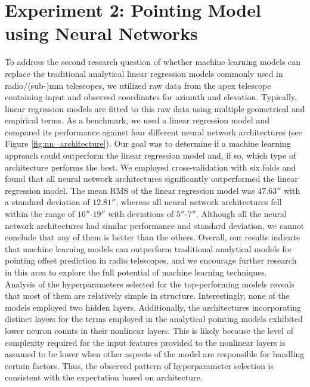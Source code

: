 \section{Experiment 2: Pointing Model using Neural Networks}
To address the second research question of whether machine learning models can replace the traditional analytical linear regression models commonly used in radio/(sub-)mm telescopes,
we utilized raw data from the apex telescope containing input and observed coordinates for azimuth and elevation.
Typically, linear regression models are fitted to this raw data using multiple geometrical and empirical terms.
As a benchmark, we used a linear regression model and compared its performance against four different neural network architectures (see Figure \ref{fig:nn_architecture}).
Our goal was to determine if a machine learning approach could outperform the linear regression model and, if so, which type of architecture performs the best.
We employed cross-validation with six folds and found that all neural network architectures significantly outperformed the linear regression model.
The mean RMS of the linear regression model was $47.63''$ with a standard deviation of $12.81''$, whereas all neural network architectures fell within the range of $16''$-$19''$ with deviations of $5''$-$7''$.
Although all the neural network architectures had similar performance and standard deviation, we cannot conclude that any of them is better than the others.
Overall, our results indicate that machine learning models can outperform traditional analytical models for pointing offset prediction in radio telescopes,
and we encourage further research in this area to explore the full potential of machine learning techniques.\\

Analysis of the hyperparameters selected for the top-performing models reveals that most of them are relatively simple in structure.
Interestingly, none of the models employed two hidden layers.
Additionally, the architectures incorporating distinct layers for the terms employed in the analytical pointing models exhibited lower neuron counts in their nonlinear layers.
This is likely because the level of complexity required for the input features provided to the nonlinear layers is assumed to be lower when other aspects of the model are responsible for handling certain factors.
Thus, the observed pattern of hyperparameter selection is consistent with the expectation based on architecture.\\

